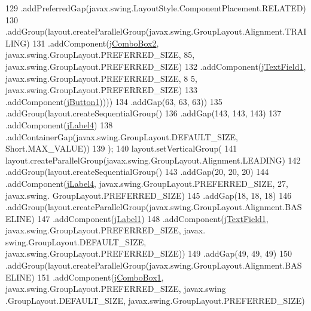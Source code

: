 \begin{DoxyCode}
129                         .addPreferredGap(javax.swing.LayoutStyle.ComponentPlacement.RELATED)
130                         .addGroup(layout.createParallelGroup(javax.swing.GroupLayout.Alignment.TRAILING)
131                             .addComponent(\mbox{\hyperlink{classejercicio2_1_1_automovil_interfaz_a787595d150a8ebd65cb621823b577788}{jComboBox2}}, javax.swing.GroupLayout.PREFERRED\_SIZE, 85,
       javax.swing.GroupLayout.PREFERRED\_SIZE)
132                             .addComponent(\mbox{\hyperlink{classejercicio2_1_1_automovil_interfaz_a3775261058e376ada92aa378228174d1}{jTextField1}}, javax.swing.GroupLayout.PREFERRED\_SIZE, 8
      5, javax.swing.GroupLayout.PREFERRED\_SIZE)
133                             .addComponent(\mbox{\hyperlink{classejercicio2_1_1_automovil_interfaz_a75207245626e5d71c200b02b55319a87}{jButton1}}))))
134                 .addGap(63, 63, 63))
135             .addGroup(layout.createSequentialGroup()
136                 .addGap(143, 143, 143)
137                 .addComponent(\mbox{\hyperlink{classejercicio2_1_1_automovil_interfaz_a67df57d2820e5dcd5af770822ec0c59f}{jLabel4}})
138                 .addContainerGap(javax.swing.GroupLayout.DEFAULT\_SIZE, Short.MAX\_VALUE))
139         );
140         layout.setVerticalGroup(
141             layout.createParallelGroup(javax.swing.GroupLayout.Alignment.LEADING)
142             .addGroup(layout.createSequentialGroup()
143                 .addGap(20, 20, 20)
144                 .addComponent(\mbox{\hyperlink{classejercicio2_1_1_automovil_interfaz_a67df57d2820e5dcd5af770822ec0c59f}{jLabel4}}, javax.swing.GroupLayout.PREFERRED\_SIZE, 27, javax.swing.
      GroupLayout.PREFERRED\_SIZE)
145                 .addGap(18, 18, 18)
146                 .addGroup(layout.createParallelGroup(javax.swing.GroupLayout.Alignment.BASELINE)
147                     .addComponent(\mbox{\hyperlink{classejercicio2_1_1_automovil_interfaz_abccabae7351cdfccc4d45b6dc07461d1}{jLabel1}})
148                     .addComponent(\mbox{\hyperlink{classejercicio2_1_1_automovil_interfaz_a3775261058e376ada92aa378228174d1}{jTextField1}}, javax.swing.GroupLayout.PREFERRED\_SIZE, javax.
      swing.GroupLayout.DEFAULT\_SIZE, javax.swing.GroupLayout.PREFERRED\_SIZE))
149                 .addGap(49, 49, 49)
150                 .addGroup(layout.createParallelGroup(javax.swing.GroupLayout.Alignment.BASELINE)
151                     .addComponent(\mbox{\hyperlink{classejercicio2_1_1_automovil_interfaz_af9e55c9052d02aceba060beb8283c4f2}{jComboBox1}}, javax.swing.GroupLayout.PREFERRED\_SIZE, javax.swing
      .GroupLayout.DEFAULT\_SIZE, javax.swing.GroupLayout.PREFERRED\_SIZE)

\end{DoxyCode}
